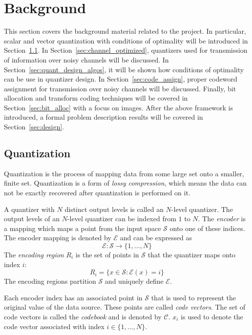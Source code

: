 \documentclass[10pt]{article}
\begin{document}
\section{Background}
\label{sec:background}
This section covers the background material related to the project. In particular, scalar and vector quantization with conditions of optimality will be introduced in Section~\ref{sec:quantization}. In Section~\ref{sec:channel_optimized}, quantizers used for transmission of information over noisy channels will be discussed. In Section~\ref{sec:quant_design_algos}, it will be shown how conditions of optimality can be use in quantizer design. In Section~\ref{sec:code_assign}, proper codeword assignment for transmission over noisy channels will be discussed. Finally, bit allocation and transform coding techniques will be covered in Section~\ref{sec:bit_alloc} with a focus on images. After the above framework is introduced, a formal problem description results will be covered in Section~\ref{sec:design}.

\subsection{Quantization}
\label{sec:quantization}
Quantization is the process of mapping data from some large set onto a smaller, finite set. Quantization is a form of \emph{lossy compression}, which means the data can not be exactly recovered after quantization is performed on it.

A quantizer with $N$ distinct output levels is called an $N$-level quantizer. The output levels of an $N$-level quantizer can be indexed from $1$ to $N$. The \emph{encoder} is a mapping which maps a point from the input space $\mathcal{S}$ onto one of these indices. The encoder mapping is denoted by $\mathcal{E}$ and can be expressed as
\begin{equation}
\mathcal{E} : \mathcal{S} \rightarrow \{1,\ldots,N\}
\end{equation}
The \emph{encoding region} $R_i$ is the set of points in $\mathcal{S}$ that the quantizer maps onto index $i$:
\begin{equation}
R_i = \{x \in \mathcal{S} : \mathcal{E}(x) = i\}
\end{equation}
The encoding regions partition $\mathcal{S}$ and uniquely define $\mathcal{E}$.

Each encoder index has an associated point in $\mathcal{S}$ that is used to represent the original value of the data source. These points are called \emph{code vectors}. The set of code vectors is called the \emph{codebook} and is denoted by $\mathcal{C}$. $x_i$ is used to denote the code vector associated with index $i \in \{1,\ldots,N\}$.
\end{document}
